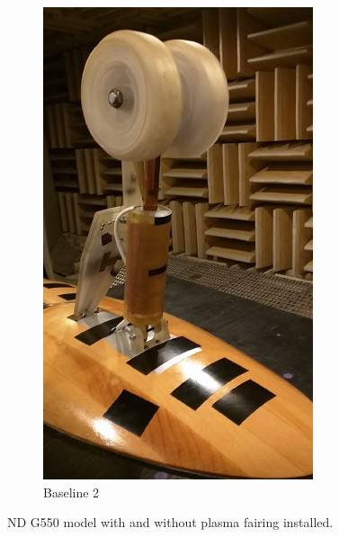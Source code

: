 \begin{figure}
\begin{center}
\begin{subfigure}{0.45\textwidth}
\includegraphics[width=\linewidth]{figures/model1b}
\caption{Baseline 2}
\label{fig:mod1b}
\end{subfigure}
\caption{ND G550 model with and without plasma fairing installed.}
\end{center}
\end{figure}

